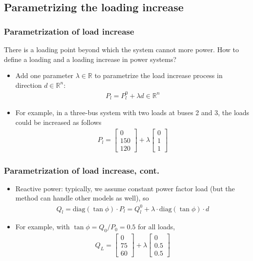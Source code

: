 \documentclass{beamer}
\newcommand*{\field}[1]{\mathbb{#1}}
\newcommand*{\R}{\field{R}} %
\begin{document}
\subsection{Parametrizing the loading increase}
\begin{frame}
  \frametitle{Parametrization of load increase}
There is a \alert{loading} point beyond which the system cannot more power.
How to define a \alert{loading} and a \alert{loading increase} in power systems?
  \begin{itemize}
  \item Add one parameter $\lambda \in \R$ to parametrize the load increase process in direction $d\in \R^n$:
    \begin{align}
      P_l = P_l^0 + \lambda d \in \R^n
    \end{align}
  \item For example, in a three-bus system with two loads at buses 2 and 3, the loads could be increased as follows
    \begin{align}
      P_l =
      \begin{bmatrix}
        0 \\
        150 \\
        120
      \end{bmatrix} + \lambda
      \begin{bmatrix}
        0 \\
        1\\
        1
      \end{bmatrix}
    \end{align}
  \end{itemize}
\end{frame}

\begin{frame}
  \frametitle{Parametrization of load increase, cont.}
  \begin{itemize}
  \item Reactive power: typically, we assume constant power factor load (but the method can handle other models as well), so
    \begin{align}
      Q_l = \text{diag}(\tan \phi) \cdot P_l = Q_l^0 + \lambda \cdot \text{diag}(\tan \phi) \cdot d 
    \end{align}
  \item For example, with $\tan \phi = Q_0/P_0 = 0.5$ for all loads, 
    \begin{align}
      Q_L =
      \begin{bmatrix}
        0\\
        75\\
        60
      \end{bmatrix} + \lambda
      \begin{bmatrix}
        0\\
        0.5\\
        0.5
      \end{bmatrix}
    \end{align}
  \end{itemize}
\end{frame}
\end{document}
